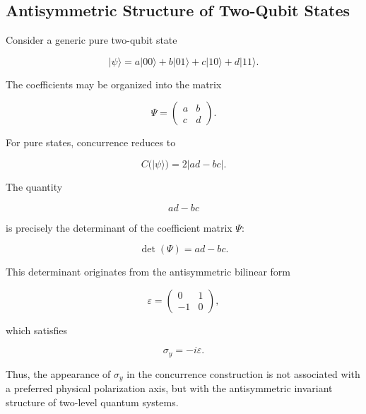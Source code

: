 \subsection*{Antisymmetric Structure of Two-Qubit States}

Consider a generic pure two-qubit state

\begin{equation}
|\psi\rangle
=
a|00\rangle
+
b|01\rangle
+
c|10\rangle
+
d|11\rangle.
\label{eq:generic_two_qubit_state_appendix}
\end{equation}

The coefficients may be organized into the matrix

\begin{equation}
\Psi
=
\begin{pmatrix}
a & b \\
c & d
\end{pmatrix}.
\label{eq:coefficient_matrix_appendix}
\end{equation}

For pure states, concurrence reduces to

\begin{equation}
C(|\psi\rangle)
=
2|ad-bc|.
\label{eq:pure_state_concurrence_appendix}
\end{equation}

The quantity

\[
ad-bc
\]

is precisely the determinant of the coefficient matrix \( \Psi \):

\begin{equation}
\det(\Psi)
=
ad-bc.
\label{eq:determinant_coefficient_matrix}
\end{equation}

This determinant originates from the antisymmetric bilinear form

\begin{equation}
\varepsilon
=
\begin{pmatrix}
0 & 1 \\
-1 & 0
\end{pmatrix},
\label{eq:antisymmetric_tensor_appendix}
\end{equation}

which satisfies

\begin{equation}
\sigma_y
=
-i\varepsilon.
\label{eq:sigma_y_epsilon_relation}
\end{equation}

Thus, the appearance of \( \sigma_y \) in the concurrence construction is not associated with a preferred physical polarization axis, but with the antisymmetric invariant structure of two-level quantum systems.

